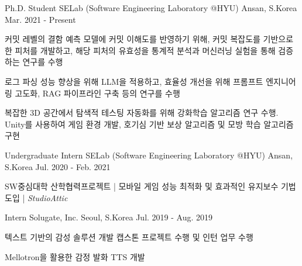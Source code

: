

\begin{cventries}

  \cventry
    {Ph.D. Student} %
    {SELab (Software Engineering Laboratory @HYU)} %
    {Ansan, S.Korea} %
    {Mar. 2021 - Present} %
    {
      \begin{cvitems} %
        \item 커밋 레벨의 결함 예측 모델에 커밋 이해도를 반영하기 위해, 커밋 복잡도를 기반으로 한 피처를 개발하고, 해당 피처의 유효성을 통계적 분석과 머신러닝 실험을 통해 검증하는 연구를 수행
        \item 로그 파싱 성능 향상을 위해 LLM을 적용하고, 효율성 개선을 위해 프롬프트 엔지니어링 고도화, RAG 파이프라인 구축 등의 연구를 수행
        \item 복잡한 3D 공간에서 탐색적 테스팅 자동화를 위해 강화학습 알고리즘 연구 수행. Unity를 사용하여 게임 환경 개발, 호기심 기반 보상 알고리즘 및 모방 학습 알고리즘 구현
      \end{cvitems}
    }

\cventry
{Undergraduate Intern} %
{SELab (Software Engineering Laboratory @HYU)} %
{Ansan, S.Korea} %
{Jul. 2020 - Feb. 2021} %
{
  \begin{cvitems} %
    \item {SW중심대학 산학협력프로젝트 | 모바일 게임 성능 최적화 및 효과적인 유지보수 기법 도입 |  \faBuilding[regular] \textit{StudioAttic}}
  \end{cvitems}
}

\cventry
{Intern} %
{Solugate, Inc.} %
{Seoul, S.Korea} %
{Jul. 2019 - Aug. 2019} %
{
  \begin{cvitems} %
    \item {텍스트 기반의 감성 솔루션 개발 캡스톤 프로젝트 수행 및 인턴 업무 수행}
    \item {Mellotron을 활용한 감정 발화 TTS 개발}
  \end{cvitems}
}


\end{cventries}


